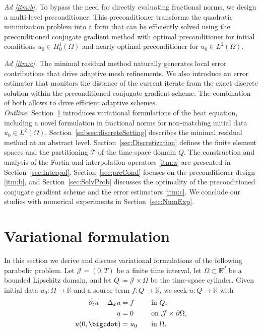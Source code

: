 \documentclass{amsart}
\providecommand{\tria}{\mathcal{T}}
\begin{document}
\textit{Ad \ref{itm:b}.}
To bypass the need for directly evaluating fractional norms, we design a multi-level preconditioner. This preconditioner transforms the quadratic minimization problem into a form that can be efficiently solved using the preconditioned conjugate gradient method with optimal preconditioner for initial conditions $u_0 \in H^1_0(\Omega)$ and nearly optimal preconditioner for $u_0 \in L^2(\Omega)$. 

\textit{Ad \ref{itm:c}.}
The minimal residual method naturally generates local error contributions that drive adaptive mesh refinements. We also introduce an error estimator that monitors the distance of the current iterate from the exact discrete solution within the preconditioned conjugate gradient scheme. The combination of both allows to drive efficient adaptive schemes.\\

\textit{Outline.}
Section~\ref{sec:VarForm} introduces variational formulations of the heat equation, including a novel formulation in fractional norms for non-matching initial data $u_0\in L^2(\Omega)$. Section~\ref{subsec:discreteSetting} describes the minimal residual method at an abstract level. Section~\ref{sec:Discretization} defines the finite element spaces and the partitioning $\tria$ of the time-space domain $Q$. The construction and analysis of the Fortin and interpolation operators \ref{itm:a} are presented in Section~\ref{sec:Interpol}. Section~\ref{sec:preCond} focuses on the preconditioner design \ref{itm:b}, and Section~\ref{sec:SolvProb} discusses the optimality of the preconditioned conjugate gradient scheme and the error estimators \ref{itm:c}. 
We conclude our studies with numerical experiments in Section~\ref{sec:NumExp}.
%
\section{Variational formulation}\label{sec:VarForm}
In this section we derive and discuss variational formulations of the following parabolic problem.
Let $\mathcal{J} = (0,T)$ be a finite time interval, let $\Omega \subset \mathbb{R}^d$ be a bounded Lipschitz domain, and let $Q \coloneqq \mathcal{J} \times \Omega$ be the time-space cylinder.
Given initial data $u_0\colon \Omega \to \mathbb{R}$ and a source term $f\colon Q \to \mathbb{R}$, we seek $u\colon Q \to \mathbb{R}$ with
\begin{equation}\label{eq:Heat}
\begin{aligned}
\partial_t u - \Delta_x u &= f&&\quad\text{in }Q,\\
u &= 0&&\quad\text{on }\mathcal{J} \times \partial \Omega,\\
u(0,\bigcdot) &= u_0&&\quad \text{in }\Omega.
\end{aligned}
\end{equation}
\end{document}
